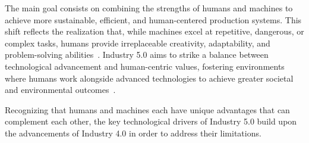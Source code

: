 The main goal consists on combining the strengths of humans and machines to achieve more sustainable, efficient, and human-centered production systems. This shift reflects the realization that, while machines excel at repetitive, dangerous, or complex tasks, humans provide irreplaceable creativity, adaptability, and problem-solving abilities~\cite{10577684}. Industry 5.0 aims to strike a balance between technological advancement and human-centric values, fostering environments where humans work alongside advanced technologies to achieve greater societal and environmental outcomes~\cite{GOLOVIANKO2023102}.


Recognizing that humans and machines each have unique advantages that can complement each other, the key technological drivers of Industry 5.0 build upon the advancements of Industry 4.0 in order to address their limitations.


